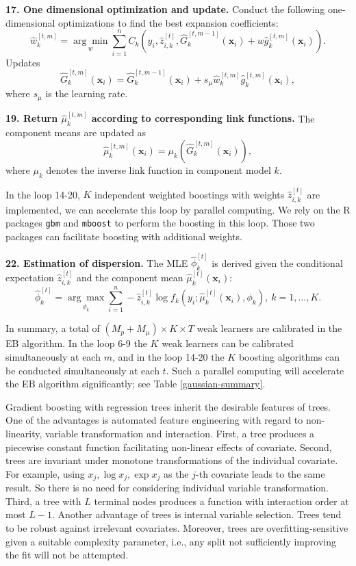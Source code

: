 \documentclass[11pt]{article}
\numberwithin{equation}{section}
\def\bx{\boldsymbol{x}}
\begin{document}
{\bf 17. One dimensional optimization and update.}	
	Conduct the following one-dimensional optimizations to find the best expansion coefficients:
		$$\hat{w}_{k}^{[t,m]}=\underset{w}{\arg\min}\sum_{i=1}^n C_{k}(y_i,\hat{z}_{i,k}^{[t]},\hat{G}_k^{[t,m-1]}(\bx_i)+w\hat{g}_k^{[t,m]}(\bx_i)).$$
		Updates
		$$\hat{G}_k^{[t,m]}(\bx_i)=\hat{G}_k^{[t,m-1]}(\bx_i)+s_\mu\hat{w}_{k}^{[t,m]}\hat{g}_{k}^{[t,m]}(\bx_i),$$
		where $s_\mu$ is the learning rate.

{\bf 19. Return $\hat{\mu}_k^{[t,m]}$ according to corresponding link functions.} The component means are updated as
		$$\hat{\mu}_k^{[t,m]}(\bx_i)=\mu_k(\hat{G}_k^{[t,m]}(\bx_i)),$$
		where $\mu_k$ denotes the inverse link function in component model $k$.

In the loop 14-20, $K$ independent weighted boostings with weights $\hat{z}_{i,k}^{[t]}$ are implemented, we can accelerate this loop  by parallel computing.
We rely on the R packages {\tt gbm} and {\tt mboost} to perform the boosting in this loop. 
Those two packages can facilitate boosting with additional weights.


{\bf 22. Estimation of dispersion.} 
The MLE $\hat{\phi}_k^{[t]}$ is derived given the conditional expectation $\hat{z}_{i,k}^{[t]}$ and the component mean $\hat{\mu}_k^{[t]}(\bx_i)$:
\begin{equation}
		\hat{\phi}_k^{[t]}=\underset{\phi_k}{\arg\max} \sum_{i=1}^n-\hat{z}_{i,k}^{[t]}\log f_k(y_i;\hat{\mu}_k^{[t]}(\bx_i),\phi_k), ~ k=1,\ldots,K.
\end{equation}

In summary, a total of $(M_p+M_\mu)\times K\times T$ weak learners are calibrated in the EB algorithm. 
In the loop 6-9  the $K$ weak learners can be calibrated simultaneously at each $m$, 
and in the loop 14-20 the $K$ boosting algorithms can be conducted simultaneously at each $t$. 
Such a parallel computing will accelerate the EB algorithm significantly; see Table \ref{gaussian-summary}.

Gradient boosting with regression trees inherit the desirable features of trees.
One of the advantages  is automated feature engineering with regard to non-linearity, variable transformation and interaction. 
First, a tree produces a piecewise constant function facilitating non-linear effects of covariate.
Second, trees are invariant under monotone transformations of the individual covariate. 
For example, using $x_j,\log x_j, \exp x_j$ as the $j$-th covariate leads to the same result.
So there is no need for considering individual variable transformation.
Third, a tree with $L$ terminal nodes produces a function with interaction order at most $L-1$.
Another advantage of trees is internal variable selection. Trees tend to be robust against irrelevant covariates.
Moreover, trees are overfitting-sensitive given a suitable complexity parameter, i.e., any split not sufficiently improving the fit will not be attempted. 
\end{document}
